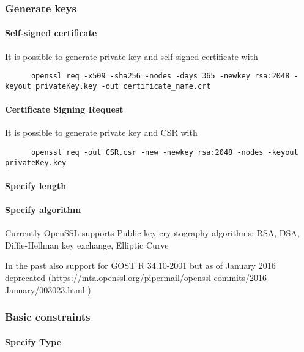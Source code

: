 \documentclass[10pt, a4paper]{report}
\begin{document}
    \subsubsection{Generate keys}
    
      \paragraph{Self-signed certificate}
      It is possible to generate private key and self signed certificate with 
      \begin{verbatim}
      openssl req -x509 -sha256 -nodes -days 365 -newkey rsa:2048 -keyout privateKey.key -out certificate_name.crt
      \end{verbatim}
      
      \paragraph{Certificate Signing Request}
      It is possible to generate private key and CSR with
      \begin{verbatim}
      openssl req -out CSR.csr -new -newkey rsa:2048 -nodes -keyout privateKey.key
      \end{verbatim}
      
      \paragraph{Specify length}
      
      
      \paragraph{Specify algorithm}
      Currently OpenSSL supports Public-key cryptography algorithms:
      RSA, DSA, Diffie-Hellman key exchange, Elliptic Curve
      
      In the past also support for GOST R 34.10-2001 but as of January 2016 deprecated (https://mta.openssl.org/pipermail/openssl-commits/2016-January/003023.html )
      
      
    \subsubsection{Basic constraints}
    
      \paragraph{Specify Type}
      
\end{document}
